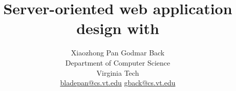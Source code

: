 \documentclass[letterpaper,twocolumn,10pt]{article}
\begin{document}
\title{\Large \bf Server-oriented web application design with \cbtwo}

\author{Xiaozhong Pan  \qquad  Godmar Back\\
Department of Computer Science\\ 
Virginia Tech\\
\url{bladepan@cs.vt.edu} \qquad  \url{gback@cs.vt.edu}
}




\maketitle
\thispagestyle{empty}










\newpage

{\footnotesize 
}

\end{document}
